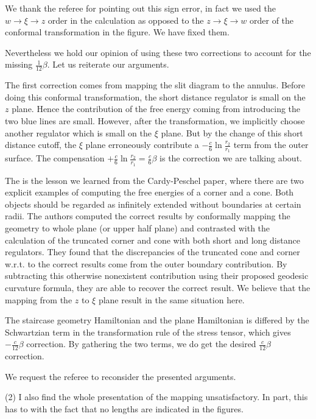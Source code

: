 \documentclass{article}
\newcommand{\reply}[1]{{\color{black}#1}}
\begin{document}
\reply{
We thank the referee for pointing out this sign error, in fact we used the $w \rightarrow \xi \rightarrow z$ order in the calculation as opposed to the $z \rightarrow \xi \rightarrow w$ order of the conformal transformation in the figure. We have fixed them.  

Nevertheless we hold our opinion of using these two corrections to account for the missing $\frac{1}{12}\beta$. Let us reiterate our arguments. 

The first correction comes from mapping the slit diagram to the annulus. Before doing this conformal transformation, the short distance regulator is small on the $z$ plane. Hence the contribution of the free energy coming from introducing the two blue lines are small. However, after the transformation, we implicitly choose another regulator which is small on the $\xi$ plane. But by the change of this short distance cutoff, the $\xi$ plane erroneously contribute a $- \frac{c}{6} \ln \frac{r_2}{r_1}$ term from the outer surface. The compensation $+\frac{c}{6} \ln \frac{r_2}{r_1} = \frac{c}{6}\beta$ is the correction we are talking about. 

The is the lesson we learned from the Cardy-Peschel paper, where there are two explicit examples of computing the free energies of a corner and a cone. Both objects should be regarded as infinitely extended without boundaries at certain radii. The authors computed the correct results by conformally mapping the geometry to whole plane (or upper half plane) and contrasted with the calculation of the truncated corner and cone with both short and long distance regulators. They found that the discrepancies of the truncated cone and corner w.r.t. to the correct results come from the outer boundary contribution. By subtracting this otherwise nonexistent contribution using their proposed geodesic curvature formula, they are able to recover the correct result. We believe that the mapping from the $z$ to $\xi$ plane result in the same situation here. 

The staircase geometry Hamiltonian and the plane Hamiltonian is differed by the Schwartzian term in the transformation rule of the stress tensor, which gives $-\frac{c}{12} \beta $ correction. By gathering the two terms, we do get the desired $\frac{c}{12}\beta$ correction. 

We request the referee to reconsider the presented arguments.
}

(2) I also find the whole presentation of the mapping unsatisfactory. In part, this has to with the fact that no lengths are indicated in the figures.
\end{document}
